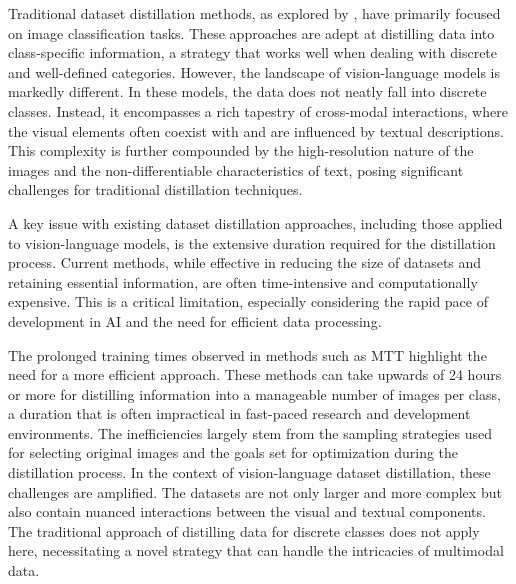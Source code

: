 \documentclass[sigconf, nonacm]{acmart}
\begin{document}
Traditional dataset distillation methods, as explored by \cite{wang2018dataset}, have primarily focused on image classification tasks. These approaches are adept at distilling data into class-specific information, a strategy that works well when dealing with discrete and well-defined categories. However, the landscape of vision-language models is markedly different. In these models, the data does not neatly fall into discrete classes. Instead, it encompasses a rich tapestry of cross-modal interactions, where the visual elements often coexist with and are influenced by textual descriptions. This complexity is further compounded by the high-resolution nature of the images and the non-differentiable characteristics of text, posing significant challenges for traditional distillation techniques.

A key issue with existing dataset distillation approaches, including those applied to vision-language models, is the extensive duration required for the distillation process. Current methods, while effective in reducing the size of datasets and retaining essential information, are often time-intensive and computationally expensive. This is a critical limitation, especially considering the rapid pace of development in AI and the need for efficient data processing. 

The prolonged training times observed in methods such as MTT \cite{G.Cazenavette} highlight the need for a more efficient approach. These methods can take upwards of 24 hours or more for distilling information into a manageable number of images per class, a duration that is often impractical in fast-paced research and development environments. The inefficiencies largely stem from the sampling strategies used for selecting original images and the goals set for optimization during the distillation process. In the context of vision-language dataset distillation, these challenges are amplified. The datasets are not only larger and more complex but also contain nuanced interactions between the visual and textual components. The traditional approach of distilling data for discrete classes does not apply here, necessitating a novel strategy that can handle the intricacies of multimodal data.
\end{document}
